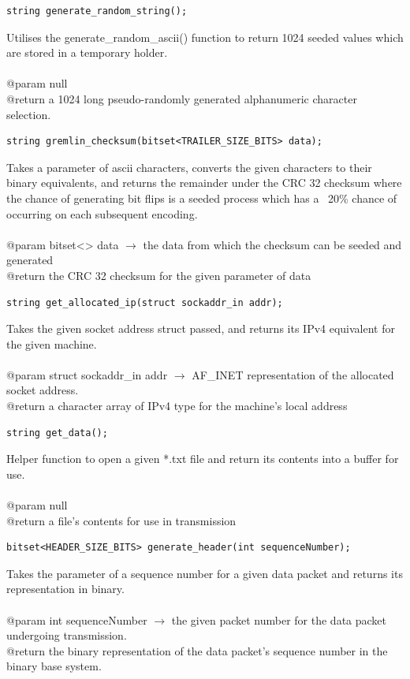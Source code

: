 \documentclass[12pt]{article}
\begin{document}
\begin{lstlisting}
string generate_random_string();
\end{lstlisting}
Utilises the generate\_random\_ascii() function to return 1024 seeded values which are stored in a temporary holder.\\\\
@param null\\
@return a 1024 long pseudo-randomly generated alphanumeric character selection.

\begin{lstlisting}
string gremlin_checksum(bitset<TRAILER_SIZE_BITS> data);
\end{lstlisting}
Takes a parameter of ascii characters, converts the given characters to their binary equivalents, and returns the remainder under the CRC 32 checksum where the chance of generating bit flips is a seeded process which has a ~20\% chance of occurring on each subsequent encoding.\\\\
@param bitset<> data $\rightarrow$ the data from which the checksum can be seeded and generated\\
@return the CRC 32 checksum for the given parameter of data

\begin{lstlisting}
string get_allocated_ip(struct sockaddr_in addr);
\end{lstlisting}
Takes the given socket address struct passed, and returns its IPv4 equivalent for the given machine.\\\\
@param struct sockaddr\_in addr $\rightarrow$ AF\_INET representation of the allocated socket address.\\
@return a character array of IPv4 type for the machine's local address

\begin{lstlisting}
string get_data();
\end{lstlisting}
Helper function to open a given *.txt file and return its contents into a buffer for use.\\\\
@param null\\
@return a file's contents for use in transmission

\begin{lstlisting}
bitset<HEADER_SIZE_BITS> generate_header(int sequenceNumber);
\end{lstlisting}
Takes the parameter of a sequence number for a given data packet and returns its representation in binary.\\\\
@param int sequenceNumber $\rightarrow$ the given packet number for the data packet undergoing transmission.\\
@return the binary representation of the data packet's sequence number in the binary base system.
\end{document}
